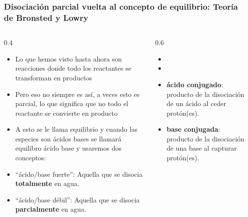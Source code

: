 \documentclass[11pt, aspectratio=169, xcolor=table]{beamer}
\begin{document}
\begin{frame}
  \frametitle{Disociación parcial vuelta al concepto de equilibrio: Teoría de Bronsted y Lowry}
  \begin{columns}
    \begin{column}{0.4\textwidth}
      \begin{itemize}
              \footnotesize
        \item Lo que hemos visto hasta ahora son reacciones donde todo los reactantes se transforman en productos
        \item Pero eso no siempre es así, a veces esto es parcial, lo que significa que no todo el reactante se convierte en producto
        \item A esto se le llama equilibrio y cuando las especies son ácidos bases se llamará equilibro ácido base y usaremos dos conceptos:
        \item ``ácido/base fuerte'': Aquella que se disocia \textbf{totalmente} en agua.
        \item ``ácido/base débil'': Aquella que se disocia \textbf{parcialmente} en agua.
      \end{itemize}
    \end{column}
    \begin{column}{0.6\textwidth}
      \begin{definition}
        \begin{itemize}
          \item[$K_a$] 
          \item[$K_b$] 
          \item \textbf{ácido conjugado}: producto de la disociación de un ácido al ceder protón(es).
          \item \textbf{base conjugada}: producto de la disociación de una base al capturar protón(es).
        \end{itemize}
      \end{definition}
    \end{column}
  \end{columns}
\end{frame}
\end{document}
